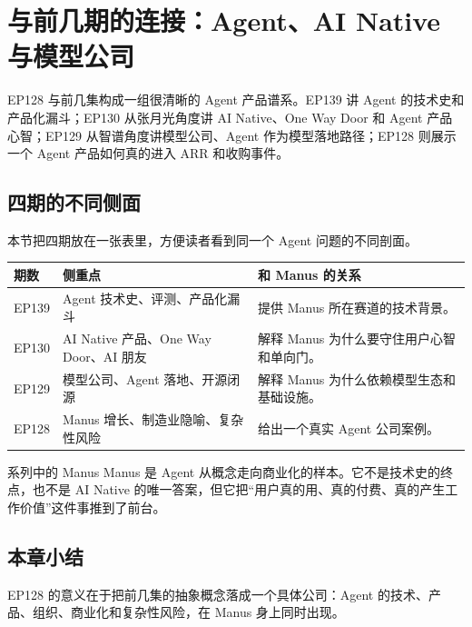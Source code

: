 \section{与前几期的连接：Agent、AI Native 与模型公司}

EP128 与前几集构成一组很清晰的 Agent 产品谱系。EP139 讲 Agent 的技术史和产品化漏斗；EP130 从张月光角度讲 AI Native、One Way Door 和 Agent 产品心智；EP129 从智谱角度讲模型公司、Agent 作为模型落地路径；EP128 则展示一个 Agent 产品如何真的进入 ARR 和收购事件。

\subsection{四期的不同侧面}

本节把四期放在一张表里，方便读者看到同一个 Agent 问题的不同剖面。

\begin{longtable}{p{}p{}p{}}
\toprule
期数 & 侧重点 & 和 Manus 的关系 \\
\midrule
EP139 & Agent 技术史、评测、产品化漏斗 & 提供 Manus 所在赛道的技术背景。 \\
EP130 & AI Native 产品、One Way Door、AI 朋友 & 解释 Manus 为什么要守住用户心智和单向门。 \\
EP129 & 模型公司、Agent 落地、开源闭源 & 解释 Manus 为什么依赖模型生态和基础设施。 \\
EP128 & Manus 增长、制造业隐喻、复杂性风险 & 给出一个真实 Agent 公司案例。 \\
\bottomrule
\end{longtable}

\begin{importantbox}{系列中的 Manus}
Manus 是 Agent 从概念走向商业化的样本。它不是技术史的终点，也不是 AI Native 的唯一答案，但它把“用户真的用、真的付费、真的产生工作价值”这件事推到了前台。
\end{importantbox}

\subsection{本章小结}

EP128 的意义在于把前几集的抽象概念落成一个具体公司：Agent 的技术、产品、组织、商业化和复杂性风险，在 Manus 身上同时出现。

